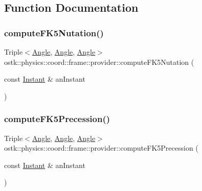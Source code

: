 \subsection{Function Documentation}
\mbox{\label{namespaceostk_1_1physics_1_1coord_1_1frame_1_1provider_a0766714124629840ab0b3a909bc6e473}} 
\subsubsection{\texorpdfstring{compute\+F\+K5\+Nutation()}{computeFK5Nutation()}}
{\footnotesize\ttfamily Triple$<$\hyperlink{classostk_1_1physics_1_1units_1_1_angle}{Angle}, \hyperlink{classostk_1_1physics_1_1units_1_1_angle}{Angle}, \hyperlink{classostk_1_1physics_1_1units_1_1_angle}{Angle}$>$ ostk\+::physics\+::coord\+::frame\+::provider\+::compute\+F\+K5\+Nutation (\begin{DoxyParamCaption}\item[{const \hyperlink{classostk_1_1physics_1_1time_1_1_instant}{Instant} \&}]{an\+Instant }\end{DoxyParamCaption})}

\mbox{\label{namespaceostk_1_1physics_1_1coord_1_1frame_1_1provider_acd9c9770d79be89d7c94517df77ebe27}} 
\subsubsection{\texorpdfstring{compute\+F\+K5\+Precession()}{computeFK5Precession()}}
{\footnotesize\ttfamily Triple$<$\hyperlink{classostk_1_1physics_1_1units_1_1_angle}{Angle}, \hyperlink{classostk_1_1physics_1_1units_1_1_angle}{Angle}, \hyperlink{classostk_1_1physics_1_1units_1_1_angle}{Angle}$>$ ostk\+::physics\+::coord\+::frame\+::provider\+::compute\+F\+K5\+Precession (\begin{DoxyParamCaption}\item[{const \hyperlink{classostk_1_1physics_1_1time_1_1_instant}{Instant} \&}]{an\+Instant }\end{DoxyParamCaption})}




